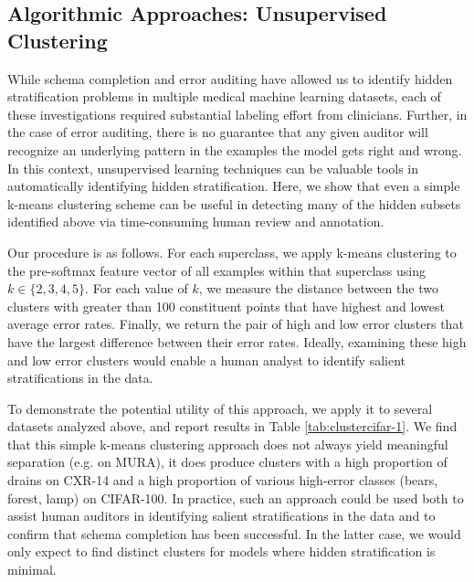\documentclass{article}
\begin{document}
\subsection{Algorithmic Approaches: Unsupervised Clustering}

While schema completion and error auditing have allowed us to identify hidden stratification problems in multiple medical machine learning datasets, each of these investigations required substantial labeling effort from clinicians.
Further, in the case of error auditing, there is no guarantee that any given auditor will recognize an underlying pattern in the examples the model gets right and wrong.
In this context, unsupervised learning techniques can be valuable tools in automatically identifying hidden stratification.
Here, we show that even a simple k-means clustering scheme can be useful in detecting many of the hidden subsets identified above via time-consuming human review and annotation.

Our procedure is as follows.  
For each superclass, we apply k-means clustering to the pre-softmax feature vector of all examples within that superclass using $k \in \{2,3,4,5\}$.
For each value of $k$, we measure the distance between the two clusters with greater than 100 constituent points that have highest and lowest average error rates.
Finally, we return the pair of high and low error clusters that have the largest difference between their error rates.
Ideally, examining these high and low error clusters would enable a human analyst to identify salient stratifications in the data.

To demonstrate the potential utility of this approach, we apply it to several datasets analyzed above, and report results in Table \ref{tab:clustercifar-1}.  
We find that this simple k-means clustering approach does not always yield meaningful separation (e.g. on MURA), it does produce clusters with a high proportion of drains on CXR-14 and a high proportion of various high-error classes (bears, forest, lamp) on CIFAR-100.  
 In practice, such an approach could be used both to assist human auditors in identifying salient stratifications in the data and to confirm that schema completion has been successful.
 In the latter case, we would only expect to find distinct clusters for models where hidden stratification is minimal.
\end{document}
